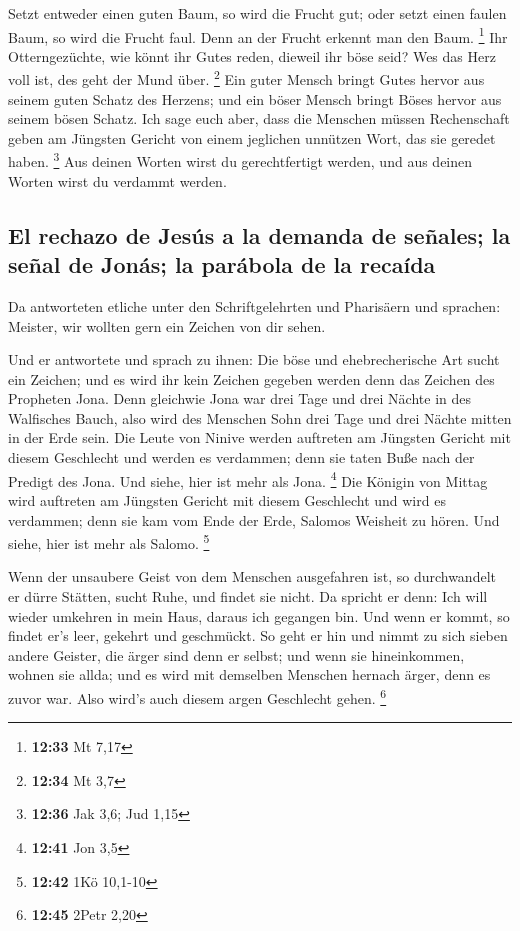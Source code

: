  Setzt entweder einen guten Baum, so wird die Frucht gut;
oder setzt einen faulen Baum, so wird die Frucht faul. Denn an der
Frucht erkennt man den Baum. \footnote{\textbf{12:33} Mt 7,17}
 Ihr Otterngezüchte, wie könnt ihr Gutes reden, dieweil
ihr böse seid? Wes das Herz voll ist, des geht der Mund über.
\footnote{\textbf{12:34} Mt 3,7}  Ein guter Mensch bringt
Gutes hervor aus seinem guten Schatz des Herzens; und ein böser Mensch
bringt Böses hervor aus seinem bösen Schatz.  Ich sage
euch aber, dass die Menschen müssen Rechenschaft geben am Jüngsten
Gericht von einem jeglichen unnützen Wort, das sie geredet haben.
\footnote{\textbf{12:36} Jak 3,6; Jud 1,15}  Aus deinen
Worten wirst du gerechtfertigt werden, und aus deinen Worten wirst du
verdammt werden.

\hypertarget{el-rechazo-de-jesuxfas-a-la-demanda-de-seuxf1ales-la-seuxf1al-de-jonuxe1s-la-paruxe1bola-de-la-recauxedda}{%
\subsection{El rechazo de Jesús a la demanda de señales; la señal de
Jonás; la parábola de la
recaída}\label{el-rechazo-de-jesuxfas-a-la-demanda-de-seuxf1ales-la-seuxf1al-de-jonuxe1s-la-paruxe1bola-de-la-recauxedda}}

 Da antworteten etliche unter den Schriftgelehrten und
Pharisäern und sprachen: Meister, wir wollten gern ein Zeichen von dir
sehen.

 Und er antwortete und sprach zu ihnen: Die böse und
ehebrecherische Art sucht ein Zeichen; und es wird ihr kein Zeichen
gegeben werden denn das Zeichen des Propheten Jona.  Denn
gleichwie Jona war drei Tage und drei Nächte in des Walfisches Bauch,
also wird des Menschen Sohn drei Tage und drei Nächte mitten in der Erde
sein.  Die Leute von Ninive werden auftreten am Jüngsten
Gericht mit diesem Geschlecht und werden es verdammen; denn sie taten
Buße nach der Predigt des Jona. Und siehe, hier ist mehr als Jona.
\footnote{\textbf{12:41} Jon 3,5}  Die Königin von Mittag
wird auftreten am Jüngsten Gericht mit diesem Geschlecht und wird es
verdammen; denn sie kam vom Ende der Erde, Salomos Weisheit zu hören.
Und siehe, hier ist mehr als Salomo. \footnote{\textbf{12:42} 1Kö
  10,1-10}

 Wenn der unsaubere Geist von dem Menschen ausgefahren
ist, so durchwandelt er dürre Stätten, sucht Ruhe, und findet sie nicht.
 Da spricht er denn: Ich will wieder umkehren in mein
Haus, daraus ich gegangen bin. Und wenn er kommt, so findet er's leer,
gekehrt und geschmückt.  So geht er hin und nimmt zu sich
sieben andere Geister, die ärger sind denn er selbst; und wenn sie
hineinkommen, wohnen sie allda; und es wird mit demselben Menschen
hernach ärger, denn es zuvor war. Also wird's auch diesem argen
Geschlecht gehen. \footnote{\textbf{12:45} 2Petr 2,20}

